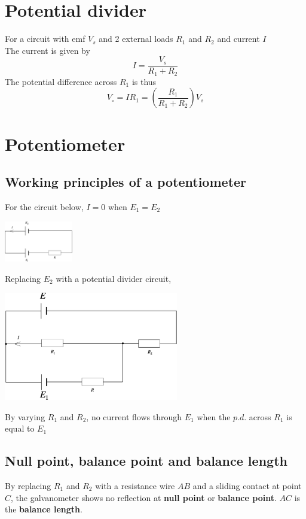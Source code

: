 \documentclass[a4paper, 10pt]{article}
\begin{document}
\section{Potential divider}
For a circuit with emf $V_s$ and 2 external loads $R_1$  and $R_2$ and current $I$  \\
The current is given by
\[
I = \frac{V_s}{R_1 + R_2}
\]
The potential difference across $R_1$ is thus
\[
   V_{\circ} = IR_1 = \left( \frac{R_1}{R_1 + R_2} \right)  V_s
\]

\section{Potentiometer}
\subsection{Working principles of a potentiometer}
For the circuit below, $I = 0$ when $E_1 = E_2$
\begin{center}
   \includegraphics[trim = 50 50 50 50, width=3cm]{figures/1.pdf} 
\end{center}	

Replacing $E_2$ with a potential divider circuit,  \\
\begin{center}
   \includegraphics[width=3in]{figures/2.pdf}  
\end{center}	

By varying $R_1$ and $R_2$, no current flows through $E_1$ when the $p.d.$ across $R_1$ is equal to $E_1$ 


\subsection{Null point, balance point and balance length}
By replacing $R_1$ and $R_2$ with a resistance wire $AB$ and a sliding contact at point $C$, the galvanometer shows no reflection at \textbf{null point} or \textbf{balance point}. $AC$ is the \textbf{balance length}. \\
\end{document}
